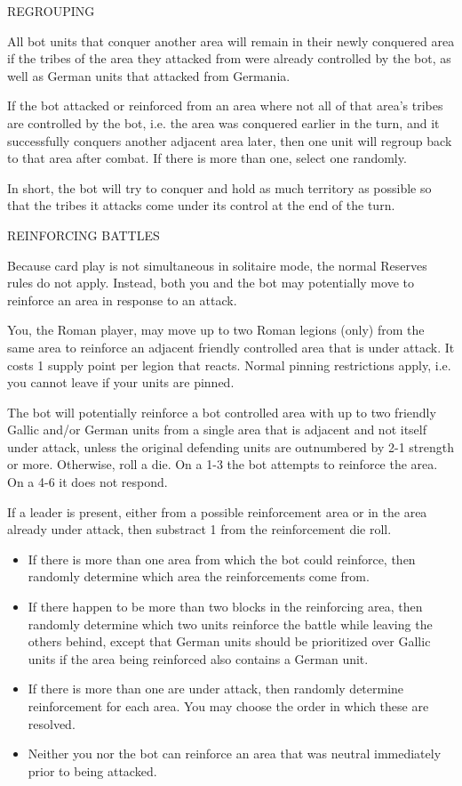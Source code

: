 \label{solitaire:regrouping}REGROUPING

All bot units that conquer another area will remain in their newly conquered area if the tribes of the area they attacked from were already controlled by the bot, as well as German units that attacked from Germania.

If the bot attacked or reinforced from an area where not all of that area's tribes are controlled by the bot, i.e. the area was conquered earlier in the turn, and it successfully conquers another adjacent area later, then one unit will regroup back to that area after combat. If there is more than one, select one randomly.

In short, the bot will try to conquer and hold as much territory as possible so that the tribes it attacks come under its control at the end of the turn.

\label{solitaire:reinforcing_battles}REINFORCING BATTLES

Because card play is not simultaneous in solitaire mode, the normal Reserves rules do not apply. Instead, both you and the bot may potentially move to reinforce an area in response to an attack.

You, the Roman player, may move up to two Roman legions (only) from the same area to reinforce an adjacent friendly controlled area that is under attack. It costs 1 supply point per legion that reacts. Normal pinning restrictions apply, i.e. you cannot leave if your units are pinned.

The bot will potentially reinforce a bot controlled area with up to two friendly Gallic and/or German units from a single area that is adjacent and not itself under attack, unless the original defending units are outnumbered by 2-1 strength or more. Otherwise, roll a die. On a 1-3 the bot attempts to reinforce the area. On a 4-6 it does not respond.

If a leader is present, either from a possible reinforcement area or in the area already under attack, then substract 1 from the reinforcement die roll.

\begin{itemize}
  \item If there is more than one area from which the bot could reinforce, then randomly determine which area the reinforcements come from.

  \item If there happen to be more than two blocks in the reinforcing area, then randomly determine which two units reinforce the battle while leaving the others behind, except that German units should be prioritized over Gallic units if the area being reinforced also contains a German unit.

  \item If there is more than one are under attack, then randomly determine reinforcement for each area. You may choose the order in which these are resolved.

  \item Neither you nor the bot can reinforce an area that was neutral immediately prior to being attacked.
\end{itemize}

